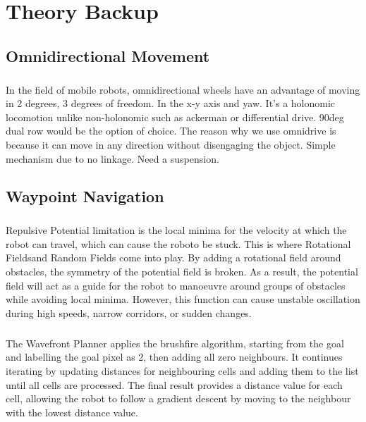 \chapter{Theory Backup}

\section{Omnidirectional Movement}
\paragraph*{}
In the field of mobile robots, omnidirectional wheels have an advantage of moving in 2 degrees, 3 degrees of freedom. In the x-y axis and yaw. It's a holonomic locomotion unlike non-holonomic such as ackerman or differential drive. 90deg dual row would be the option of choice. The reason why we use omnidrive is because it can move in any direction without disengaging the object. Simple mechanism due to no linkage. Need a suspension.

\section{Waypoint Navigation}

\paragraph*{}
Repulsive Potential limitation is the local minima for the velocity at which the robot can travel, which can cause the roboto be stuck. This is where Rotational Fieldsand Random Fields come into play. By adding a rotational field around obstacles, the symmetry of the potential field is broken. As a result, the potential field will act as a guide for the robot to manoeuvre around groups of obstacles while avoiding local minima. However, this function can cause unstable oscillation during high speeds, narrow corridors, or sudden changes. 

\paragraph*{}
The Wavefront Planner applies the brushfire algorithm, starting from the goal and labelling the goal pixel as 2, then adding all zero neighbours. It continues iterating by updating distances for neighbouring cells and adding them to the list until all cells are processed. The final result provides a distance value for each cell, allowing the robot to follow a gradient descent by moving to the neighbour with the lowest distance value.

